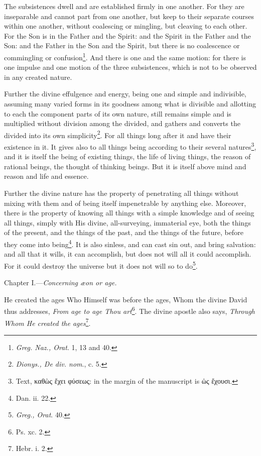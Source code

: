 The subsistences dwell and are established firmly in one another. For they are inseparable and cannot part from one another, but keep to their separate courses within one another, without coalescing or mingling, but cleaving to each other. For the Son is in the Father and the Spirit: and the Spirit in the Father and the Son: and the Father in the Son and the Spirit, but there is no coalescence or commingling or confusion\footnote{\emph{Greg. Naz., Orat}. 1, 13 and 40.}. And there is one and the same motion: for there is one impulse and one motion of the three subsistences, which is not to be observed in any created nature.

Further the divine effulgence and energy, being one and simple and indivisible, assuming many varied forms in its goodness among what is divisible and allotting to each the component parts of its own nature, still remains simple and is multiplied without division among the divided, and gathers and converts the divided into its own simplicity\footnote{\emph{Dionys., De div. nom}., c. 5.}. For all things long after it and have their existence in it. It gives also to all things being according to their several natures\footnote{Text, \textgreek{καθὼς ἔχει φύσεως}: in the margin of the manuscript is \textgreek{ὡς ἔχουσι}.}, and it is itself the being of existing things, the life of living things, the reason of rational beings, the thought of thinking beings. But it is itself above mind and reason and life and essence.

Further the divine nature has the property of penetrating all things without mixing with them and of being itself impenetrable by anything else. Moreover, there is the property of knowing all things with a simple knowledge and of seeing all things, simply with His divine, all-surveying, immaterial eye, both the things of the present, and the things of the past, and the things of the future, before they come into being\footnote{Dan. ii. 22.}. It is also sinless, and can cast sin out, and bring salvation: and all that it wills, it can accomplish, but does not will all it could accomplish. For it could destroy the universe but it does not will so to do\footnote{\emph{Greg., Orat}. 40.}.



Chapter I.—\emph{Concerning æon or age.}

He created the ages Who Himself was before the ages, Whom the divine David thus addresses, \emph{From age to age Thou art}\footnote{Ps. xc. 2.}. The divine apostle also says, \emph{Through Whom He created the ages}\footnote{Hebr. i. 2.}.

